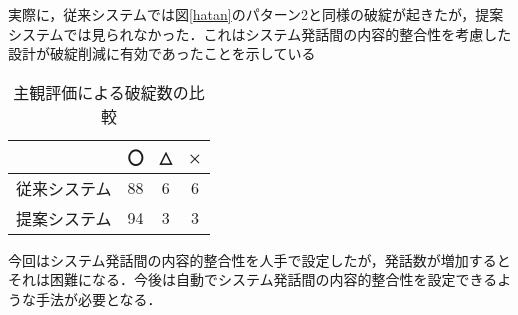 \documentclass[a4,twocolumn,dvipdfmx]{jarticle}
\newcommand\mychangecolor[1]{\textcolor[rgb]{1,0,0}{\textbf{#1}}}
\begin{document}
実際に，従来システムでは図\ref{hatan}のパターン2と同様の破綻が起きたが，提案システムでは見られなかった．これはシステム発話間の内容的整合性を考慮した設計が破綻削減に有効であったことを示している
\begin{table}[tb]
\caption{主観評価による破綻数の比較}
\centering
  \begin{tabular}{|l|c|c|c|} \hline
      &〇& △& × \\ \hline \hline
    従来システム & 88 & 6 & 6\\ \hline
    提案システム & 94 & 3 & 3 \\ \hline
  \end{tabular}\label{hyoka}
\end{table}
\begin{comment}
\begin{table}[htb]
\caption{西本らの手法での破綻例}
\centering
\begin{Verbatim}[commandchars=\\\{\}]
S: どんなスポーツをされましたか？  
U: バドミントンは昔してましたね．  
\mychangecolor{S: それは大変ですよね。}  
U: 大変ですかね 

\end{Verbatim}
\end{table}
\end{comment}

今回はシステム発話間の内容的整合性を人手で設定したが，発話数が増加するとそれは困難になる．今後は自動でシステム発話間の内容的整合性を設定できるような手法が必要となる．






\end{document}
